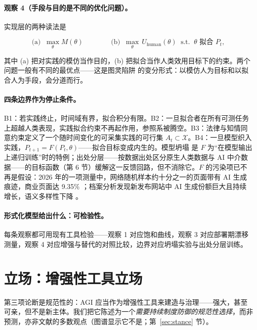 \documentclass[10pt,fontset=fandol]{ctexart}
\begin{document}
\paragraph{观察 4（手段与目的是不同的优化问题）。} 实现层的两种读法是

\[\text{(a)}\;\; \max_\theta M(\theta) \qquad\qquad \text{(b)}\;\; \max_\theta\, U_{\mathrm{human}}(\theta) \;\; \text{s.t.} \;\; \theta \text{ 拟合 } P_t,\]

其中 (a) 把对实践的模仿当作目的，(b) 把拟合当作人类效用目标下的约束。两个问题一般有不同的最优点——这是图灵陷阱 \cite{brynjolfsson2022turing} 的变分形式：以模仿人为目标和以拟合人为手段，会分道而行。

\paragraph{四条边界作为停止条件。} B1：若实践终止，时间域有界，拟合积分有限。B2：一旦拟合者在所有可测任务上超越人类表现，实践拟合约束不再起作用，参照系被腾空。B3：法律与知情同意约束定义了一个随时间变化的可采集实践的可行集 $A_t \subset \mathcal{X}$。B4：一旦模型织入实践，$P_{t+1} = F(P_t, \theta)$——拟合目标变成内生的。模型坍塌 \cite{shumailov2024collapse} 是 $F$ 为“在模型输出上递归训练”时的特例；出处分层——按数据出处区分原生人类数据与 AI 中介数据——的目标函数（第 6 节）缓解这一反馈回路，但不消除它。$F$ 的污染项已不再是假设：2026 年的一项测量中，网络随机样本约十分之一的页面带有 AI 生成痕迹，商业页面达 9.35\% \cite{pew2026aiweb}；档案分析发现新发布网站中 AI 生成份额巨大且持续增长，语义多样性下降 \cite{dolezal2026impact}。

\paragraph{形式化模型给出什么：可检验性。} 每条观察都可用现有工具检验——观察 1 对应饱和曲线，观察 3 对应部署期漂移测量，观察 4 对应增强与替代的对照比较，边界对应坍塌实验与出处分层训练。

\section{立场：增强性工具立场}\label{sec:position}

第三项论断是规范性的：AGI 应当作为增强性工具来建造与治理——强大，甚至可亲，但不是新主体。我们把它陈述为一个\emph{需要持续制度防御的规范性选择}，而非预测，亦非文献的多数观点（图谱显示它不是；第~\ref{sec:stance} 节）。
\end{document}
